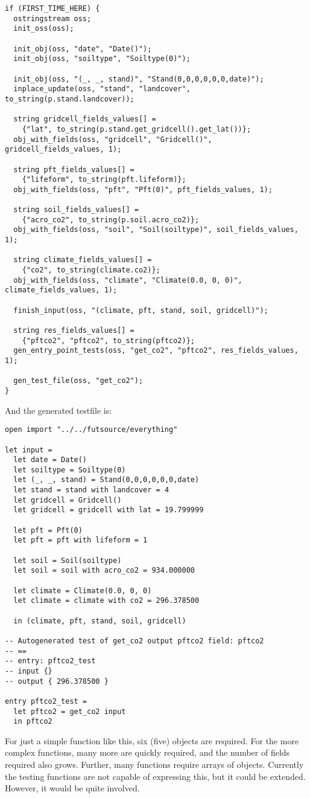 \begin{verbatim}
if (FIRST_TIME_HERE) {
  ostringstream oss;
  init_oss(oss);

  init_obj(oss, "date", "Date()");
  init_obj(oss, "soiltype", "Soiltype(0)");

  init_obj(oss, "(_, _, stand)", "Stand(0,0,0,0,0,0,date)");
  inplace_update(oss, "stand", "landcover", to_string(p.stand.landcover));

  string gridcell_fields_values[] =
    {"lat", to_string(p.stand.get_gridcell().get_lat())};
  obj_with_fields(oss, "gridcell", "Gridcell()", gridcell_fields_values, 1);

  string pft_fields_values[] =
    {"lifeform", to_string(pft.lifeform)};
  obj_with_fields(oss, "pft", "Pft(0)", pft_fields_values, 1);

  string soil_fields_values[] =
    {"acro_co2", to_string(p.soil.acro_co2)};
  obj_with_fields(oss, "soil", "Soil(soiltype)", soil_fields_values, 1);

  string climate_fields_values[] =
    {"co2", to_string(climate.co2)};
  obj_with_fields(oss, "climate", "Climate(0.0, 0, 0)", climate_fields_values, 1);

  finish_input(oss, "(climate, pft, stand, soil, gridcell)");

  string res_fields_values[] =
    {"pftco2", "pftco2", to_string(pftco2)};
  gen_entry_point_tests(oss, "get_co2", "pftco2", res_fields_values, 1);

  gen_test_file(oss, "get_co2");
}
\end{verbatim}

And the generated testfile is:

\begin{verbatim}
open import "../../futsource/everything"

let input =
  let date = Date()
  let soiltype = Soiltype(0)
  let (_, _, stand) = Stand(0,0,0,0,0,0,date)
  let stand = stand with landcover = 4
  let gridcell = Gridcell()
  let gridcell = gridcell with lat = 19.799999

  let pft = Pft(0)
  let pft = pft with lifeform = 1

  let soil = Soil(soiltype)
  let soil = soil with acro_co2 = 934.000000

  let climate = Climate(0.0, 0, 0)
  let climate = climate with co2 = 296.378500

  in (climate, pft, stand, soil, gridcell)

-- Autogenerated test of get_co2 output pftco2 field: pftco2
-- ==
-- entry: pftco2_test
-- input {}
-- output { 296.378500 }

entry pftco2_test =
  let pftco2 = get_co2 input
  in pftco2
\end{verbatim}

For just a simple function like this, six (five) objects are required. For the more complex functions, many more are quickly required, and the number of fields required also grows. Further, many functions require arrays of objects. Currently the testing functions are not capable of expressing this, but it could be extended. However, it would be quite involved.
